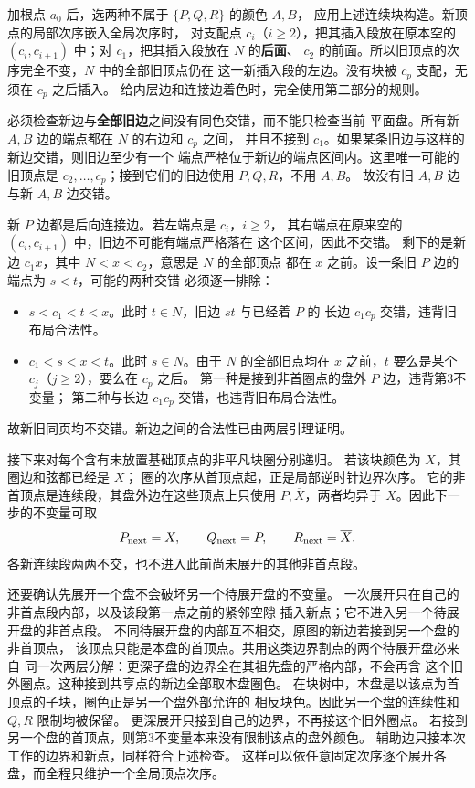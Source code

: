 \begin{solution}
加根点 $a_0$ 后，选两种不属于 $\{P,Q,R\}$ 的颜色 $A,B$，
应用上述连续块构造。新顶点的局部次序嵌入全局次序时，
对支配点 $c_i$（$i\geq2$），把其插入段放在原本空的
$(c_i,c_{i+1})$ 中；对 $c_1$，把其插入段放在 $N$ 的\textbf{后面}、
$c_2$ 的前面。所以旧顶点的次序完全不变，$N$ 中的全部旧顶点仍在
这一新插入段的左边。没有块被 $c_p$ 支配，无须在 $c_p$ 之后插入。
给内层边和连接边着色时，完全使用第二部分的规则。

必须检查新边与\textbf{全部旧边}之间没有同色交错，而不能只检查当前
平面盘。所有新 $A,B$ 边的端点都在 $N$ 的右边和 $c_p$ 之间，
并且不接到 $c_1$。如果某条旧边与这样的新边交错，则旧边至少有一个
端点严格位于新边的端点区间内。这里唯一可能的旧顶点是
$c_2,\ldots,c_p$；接到它们的旧边使用 $P,Q,R$，不用 $A,B$。
故没有旧 $A,B$ 边与新 $A,B$ 边交错。

新 $P$ 边都是后向连接边。若左端点是 $c_i$，$i\geq2$，
其右端点在原来空的 $(c_i,c_{i+1})$ 中，旧边不可能有端点严格落在
这个区间，因此不交错。
剩下的是新边 $c_1x$，其中 $N<x<c_2$，意思是 $N$ 的全部顶点
都在 $x$ 之前。设一条旧 $P$ 边的端点为 $s<t$，可能的两种交错
必须逐一排除：
\begin{itemize}
\item $s<c_1<t<x$。此时 $t\in N$，旧边 $st$ 与已经着 $P$ 的
  长边 $c_1c_p$ 交错，违背旧布局合法性。
\item $c_1<s<x<t$。此时 $s\in N$。由于 $N$ 的全部旧点均在
  $x$ 之前，$t$ 要么是某个 $c_j$（$j\geq2$），要么在 $c_p$ 之后。
  第一种是接到非首圈点的盘外 $P$ 边，违背第3不变量；
  第二种与长边 $c_1c_p$ 交错，也违背旧布局合法性。
\end{itemize}
故新旧同页均不交错。新边之间的合法性已由两层引理证明。

接下来对每个含有未放置基础顶点的非平凡块圈分别递归。
若该块颜色为 $X$，其圈边和弦都已经是 $X$；
圈的次序从首顶点起，正是局部逆时针边界次序。
它的非首顶点是连续段，其盘外边在这些顶点上只使用
$P,\overline X$，两者均异于 $X$。因此下一步的不变量可取
\[
 P_{\rm next}=X,\qquad Q_{\rm next}=P,
 \qquad R_{\rm next}=\overline X.
\]
各新连续段两两不交，也不进入此前尚未展开的其他非首点段。

还要确认先展开一个盘不会破坏另一个待展开盘的不变量。
一次展开只在自己的非首点段内部，以及该段第一点之前的紧邻空隙
插入新点；它不进入另一个待展开盘的非首点段。
不同待展开盘的内部互不相交，原图的新边若接到另一个盘的非首顶点，
该顶点只能是本盘的首顶点。共用这类边界割点的两个待展开盘必来自
同一次两层分解：更深子盘的边界全在其祖先盘的严格内部，不会再含
这个旧外圈点。这种接到共享点的新边全部取本盘圈色。
在块树中，本盘是以该点为首顶点的子块，圈色正是另一个盘外部允许的
相反块色。因此另一个盘的连续性和 $Q,R$ 限制均被保留。
更深展开只接到自己的边界，不再接这个旧外圈点。
若接到另一个盘的首顶点，则第3不变量本来没有限制该点的盘外颜色。
辅助边只接本次工作的边界和新点，同样符合上述检查。
这样可以依任意固定次序逐个展开各盘，而全程只维护一个全局顶点次序。


\end{solution}
